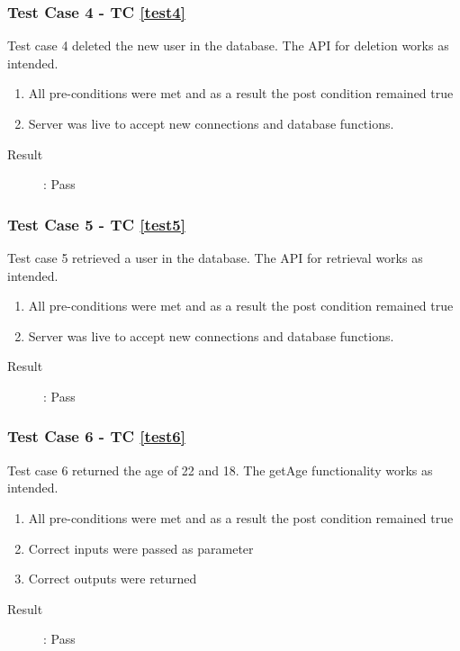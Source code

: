 \documentclass{article}
\begin{document}
\subsubsection{Test Case 4 - TC \ref{test4}}
Test case 4 deleted the new user in the database.
The API for deletion works as intended.
\begin{enumerate}
	\item All pre-conditions were met and as a result the post condition remained true
	\item Server was live to accept new connections and database functions.
\end{enumerate}

\begin{description}
	\item [Result]: Pass 
\end{description}

\subsubsection{Test Case 5 - TC \ref{test5}}
Test case 5 retrieved a user in the database.
The API for retrieval works as intended.
\begin{enumerate}
	\item All pre-conditions were met and as a result the post condition remained true
	\item Server was live to accept new connections and database functions.
\end{enumerate}

\begin{description}
	\item [Result]: Pass 
\end{description}

\subsubsection{Test Case 6 - TC \ref{test6}}
Test case 6 returned the age of 22 and 18. 
The getAge functionality works as intended.
\begin{enumerate}
	\item All pre-conditions were met and as a result the post condition remained true
	\item Correct inputs were passed as parameter 
	\item Correct outputs were returned
\end{enumerate}

\begin{description}
	\item [Result]: Pass 
\end{description}
\end{document}
